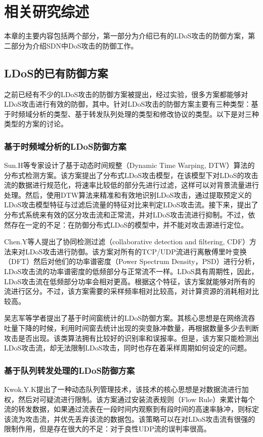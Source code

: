 \chapter{相关研究综述}
\label{cha:relatedWork}

本章的主要内容包括两个部分，第一部分为介绍已有的LDoS攻击的防御方案，第二部分为介绍SDN中DoS攻击的防御工作。

\section{LDoS的已有防御方案}
\label{chap2:LDoSwork}
之前已经有不少的LDoS攻击的防御方案被提出，经过实验，很多方案都能够对LDoS攻击进行有效的防御，其中。针对LDoS攻击的防御方案主要有三种类型：基于时频域分析的类型、基于转发队列处理的类型和修改协议的类型。以下是对三种类型的方案的讨论。


\subsection{基于时频域分析的LDoS防御方案}
\label{chap2:TFanalysis}

Sun.H\cite{b4}等专家设计了基于动态时间规整（Dynamic Time Warping, DTW）算法的分布式检测方案。该方案提出了分布式LDoS攻击模型，在该模型下对LDoS的攻击流的数据进行规范化，将速率比较低的部分先进行过滤，这样可以对背景流量进行处理。然后，使用DTW算法来精准和有效地识别LDoS攻击，通过提取预定义的LDoS攻击模型特征与过滤后流量的特征对比来判定LDoS攻击流。接下来，提出了分布式系统来有效的区分攻击流和正常流，并对LDoS攻击流进行抑制。不过，依然存在一定的不足：在防御分布式LDoS的模型中，并不能对攻击源进行定位。

Chen.Y\cite{b7}等人提出了协同检测过滤（collaborative detection and filtering, CDF）方法来对LDoS攻击进行防御。该方案对所有的TCP/UDP流进行离散傅里叶变换（DFT）然后对他们的功率谱密度（Power Spectrum Density，PSD）进行分析，LDoS攻击流的功率谱密度的低频部分与正常流不一样。LDoS具有周期性，因此，LDoS攻击流在低频部分功率会相对更高。根据这个特征，该方案就能够对所有的流进行区分。不过，该方案需要的采样频率相对比较高，对计算资源的消耗相对比较高。

吴志军\cite{wuLDoSdetect}等学者提出了基于时间窗统计的LDoS防御方案。其核心思想是在网络流吞吐量下降的时候，利用时间窗去统计出现的突变脉冲数量，再根据数量多少去判断攻击是否出现。该类算法拥有比较好的识别率和误报率。但是，该方案只能检测出LDoS攻击流，却无法限制LDoS攻击，同时也存在着采样周期如何设定的问题。



\subsection{基于队列转发处理的LDoS防御方案}
\label{chap2:queanalysis}
Kwok.Y.K\cite{b22}提出了一种动态队列管理技术，该技术的核心思想是对数据流进行加权，然后对可疑流进行限制。该方案通过安装流表规则（Flow Rule）来累计每个流的转发数据，如果通过流表在一段时间内观察到有段时间的高速率脉冲，则标定该流为攻击流，并优先丢弃该流的数据包。该策略可以在对LDoS攻击流有很强的限制作用，但是存在很大的不足：对于良性UDP流的误判率很高。

